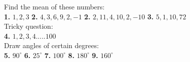\documentclass[a4paper]{article}
\begin{document}
\begin{LARGE}

Find the mean of these numbers: \\[0.1cm]

\textbf{1.} $1,2,3$ \hspace{0.3cm}
\textbf{2.} $4,3,6,9,2,-1$ \hspace{0.3cm}
\textbf{2.} $2,11,4,10,2,-10$ \hspace{0.3cm}
\textbf{3.} $5,1,10,72$ \\[0.1cm]

Tricky question: \\[0.1cm]

\textbf{4.} $1,2,3,4 ..... 100$ \\[0.1cm]

Draw angles of certain degrees: \\[0.1cm]

\textbf{5.} $90 ^{\circ}$ \hspace{0.3cm}
\textbf{6.} $25 ^{\circ}$ \hspace{0.3cm}
\textbf{7.} $100 ^{\circ}$ \hspace{0.3cm}
\textbf{8.} $180 ^{\circ}$ \hspace{0.3cm}
\textbf{9.} $160 ^{\circ}$ \\[0.1cm]


\end{LARGE}
\end{document}
